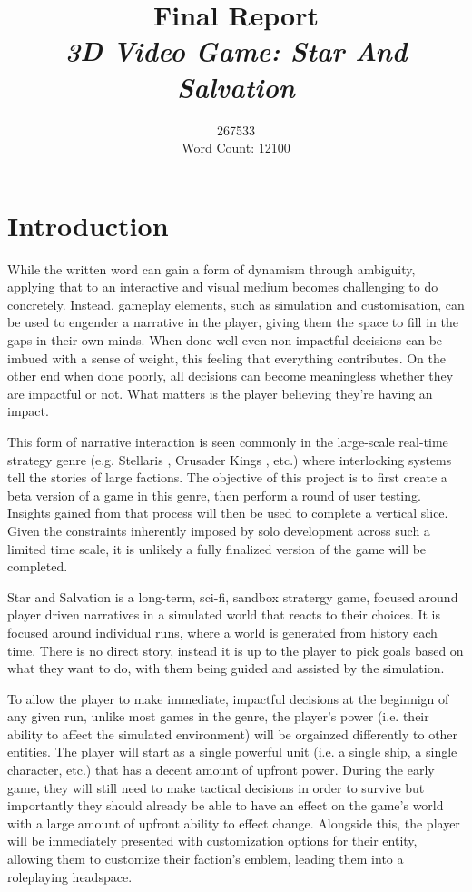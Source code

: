 \documentclass{report}
\begin{document}
\title{
Final Report \\ 
\textit{3D Video Game: Star And Salvation} }
\author{267533\\
\large Word Count: 12100}

\maketitle

\tableofcontents

\chapter{Introduction}
While the written word can gain a form of dynamism through ambiguity, applying that to an interactive and visual medium becomes challenging to do concretely. Instead, gameplay elements, such as simulation and customisation, can be used to engender a narrative in the player, giving them the space to fill in the gaps in their own minds. When done well even non impactful decisions can be imbued with a sense of weight, this feeling that everything contributes. On the other end when done poorly, all decisions can become meaningless whether they are impactful or not. What matters is the player believing they're having an impact. 

This form of narrative interaction is seen commonly in the large-scale real-time strategy genre (e.g. Stellaris \cite{stellaris}, Crusader Kings \cite{crusaderkings}, etc.) where interlocking systems tell the stories of large factions. The objective of this project is to first create a beta version of a game in this genre, then perform a round of user testing. Insights gained from that process will then be used to complete a vertical slice. Given the constraints inherently imposed by solo development across such a limited time scale, it is unlikely a fully finalized version of the game will be completed.

Star and Salvation is a long-term, sci-fi, sandbox stratergy game, focused around player driven narratives in a simulated world that reacts to their choices. It is focused around individual runs, where a world is generated from history each time. There is no direct story, instead it is up to the player to pick goals based on what they want to do, with them being guided and assisted by the simulation.

To allow the player to make immediate, impactful decisions at the beginnign of any given run, unlike most games in the genre, the player's power (i.e. their ability to affect the simulated environment) will be orgainzed differently to other entities. The player will start as a single powerful unit (i.e. a single ship, a single character, etc.) that has a decent amount of upfront power. During the early game, they will still need to make tactical decisions in order to survive but importantly they should already be able to have an effect on the game's world with a large amount of upfront ability to effect change. Alongside this, the player will be immediately presented with customization options for their entity, allowing them to customize their faction's emblem, leading them into a roleplaying headspace.
\end{document}
